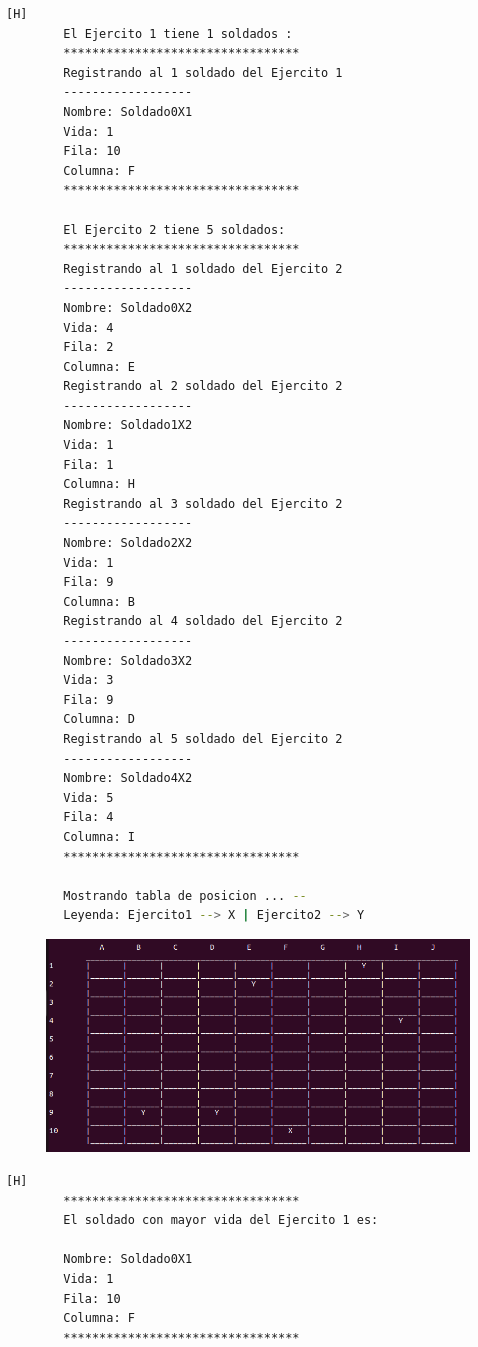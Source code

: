 \documentclass{article}
\begin{document}
	\begin{lstlisting}[language=bash,caption={Ejecucion:}][H]
		El Ejercito 1 tiene 1 soldados : 
		*********************************
		Registrando al 1 soldado del Ejercito 1
		------------------
		Nombre: Soldado0X1
		Vida: 1
		Fila: 10
		Columna: F
		*********************************

		El Ejercito 2 tiene 5 soldados:
		*********************************
		Registrando al 1 soldado del Ejercito 2
		------------------
		Nombre: Soldado0X2
		Vida: 4
		Fila: 2
		Columna: E
		Registrando al 2 soldado del Ejercito 2
		------------------
		Nombre: Soldado1X2
		Vida: 1
		Fila: 1
		Columna: H
		Registrando al 3 soldado del Ejercito 2
		------------------
		Nombre: Soldado2X2
		Vida: 1
		Fila: 9
		Columna: B
		Registrando al 4 soldado del Ejercito 2
		------------------
		Nombre: Soldado3X2
		Vida: 3
		Fila: 9
		Columna: D
		Registrando al 5 soldado del Ejercito 2
		------------------
		Nombre: Soldado4X2
		Vida: 5
		Fila: 4
		Columna: I
		*********************************

		Mostrando tabla de posicion ... --
		Leyenda: Ejercito1 --> X | Ejercito2 --> Y

	\end{lstlisting}
	\begin{figure}[H]
		\centering
		\includegraphics[width=1.0\textwidth,keepaspectratio]{img/Commit5.png}
	\end{figure}
	\begin{lstlisting}[language=bash,caption={Ejecucion:}][H]
		*********************************
		El soldado con mayor vida del Ejercito 1 es: 
		
		Nombre: Soldado0X1
		Vida: 1
		Fila: 10
		Columna: F
		*********************************
		
	\end{lstlisting}
\end{document}
